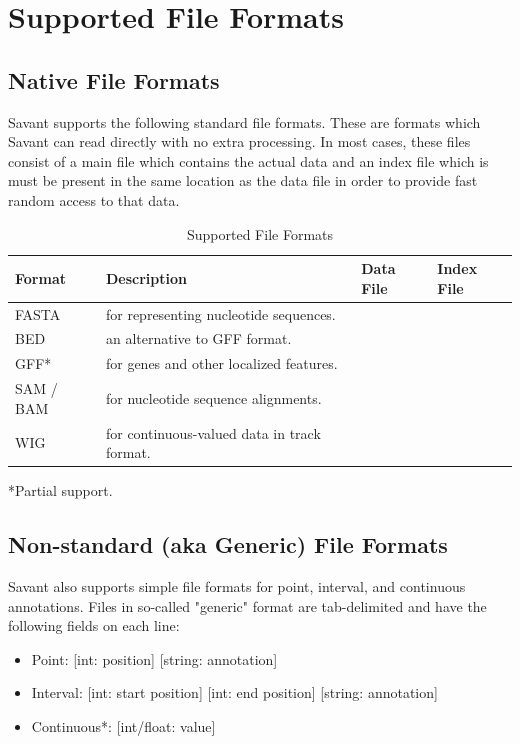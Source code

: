 \documentclass{report}
\begin{document}
\section{Supported File Formats}

\subsection{Native File Formats}

Savant supports the following standard file formats.  These are formats which Savant can read directly with no extra processing.  In most cases, these files consist of a main file which contains the actual data and an index file which is must be present in the same location as the data file in order to provide fast random access to that data.

\begin{table}[ht] 
\caption{Supported File Formats}  
\begin{tabular*}{6in}{ l l l l }  
\hline                      
Format & Description & Data File & Index File\\
\hline                    
FASTA & for representing nucleotide sequences.  \\
BED & an alternative to GFF format. \\
GFF* & for genes and other localized features. \\   
SAM / BAM & for nucleotide  sequence alignments. \\
WIG & for continuous-valued data in track format. \\      
\hline     
\end{tabular*} 
\end{table} 

*Partial support.

\subsection{Non-standard (aka Generic) File Formats}

Savant also supports simple file formats for point, interval, and continuous annotations. Files in so-called "generic" format are tab-delimited and have the following fields on each line:

\begin{itemize}
\item Point: [int: position] [string: annotation]
\item Interval: [int: start position] [int: end position] [string: annotation]
\item Continuous*: [int/float: value]
\end{itemize}
\end{document}
